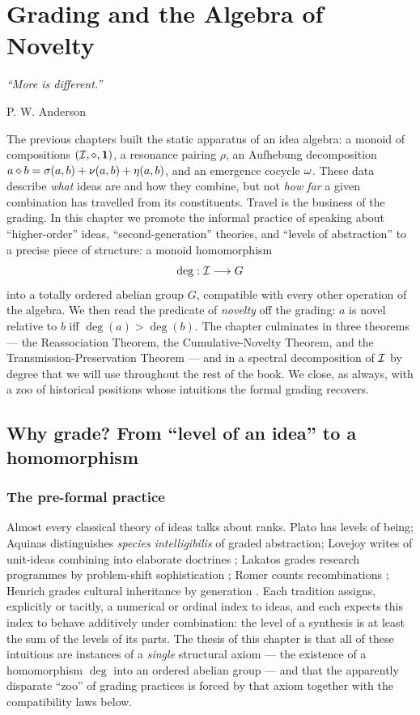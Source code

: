 \chapter{Grading and the Algebra of Novelty}\label{ch:grading}

\epigraph{\itshape ``More is different.''}{P. W. Anderson \cite{Anderson1972}}

The previous chapters built the static apparatus of an idea algebra: a
monoid of compositions $(\mathcal{I},\mathbin{\diamond},\mathbf{1})$, a resonance pairing $\rho$, an Aufhebung
decomposition $a\mathbin{\diamond} b = \sigma(a,b) + \nu(a,b) +
\eta(a,b)$, and an emergence cocycle $\omega$. These data describe
\emph{what} ideas are and how they combine, but not \emph{how far} a
given combination has travelled from its constituents. Travel is the
business of the grading. In this chapter we promote the informal
practice of speaking about ``higher-order'' ideas, ``second-generation''
theories, and ``levels of abstraction'' to a precise piece of structure:
a monoid homomorphism
\[
  \deg : \mathcal{I} \longrightarrow G
\]
into a totally ordered abelian group $G$, compatible with every other
operation of the algebra. We then read the predicate of \emph{novelty}
off the grading: $a$ is novel relative to $b$ iff $\deg(a) > \deg(b)$.
The chapter culminates in three theorems --- the
Reassociation Theorem, the Cumulative-Novelty Theorem, and the
Transmission-Preservation Theorem --- and in a spectral decomposition of
$\mathcal{I}$ by degree that we will use throughout the rest of the book. We
close, as always, with a zoo of historical positions whose intuitions
the formal grading recovers.

\section{Why grade? From ``level of an idea'' to a homomorphism}
\label{sec:why-grade}

\subsection*{The pre-formal practice}

Almost every classical theory of ideas talks about ranks. Plato has
levels of being; Aquinas distinguishes \emph{species intelligibilis} of
graded abstraction; Lovejoy writes of unit-ideas combining into
elaborate doctrines \cite{Lovejoy1936}; Lakatos grades research
programmes by problem-shift sophistication \cite{Lakatos1970}; Romer
counts recombinations \cite{Romer1990}; Henrich grades cultural
inheritance by generation \cite{Henrich2015}. Each tradition assigns,
explicitly or tacitly, a numerical or ordinal index to ideas, and each
expects this index to behave additively under combination: the level of
a synthesis is at least the sum of the levels of its parts. The thesis
of this chapter is that all of these intuitions are instances of a
\emph{single} structural axiom --- the existence of a homomorphism
$\deg$ into an ordered abelian group --- and that the apparently
disparate ``zoo'' of grading practices is forced by that axiom together
with the compatibility laws below.

